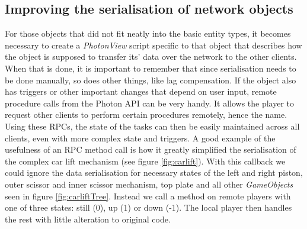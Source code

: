 \subsection{Improving the serialisation of network objects}
For those objects that did not fit neatly into the basic entity types, it becomes necessary to create a \textit{PhotonView} script specific to that object that describes how the object is supposed to transfer its' data over the network to the other clients. When that is done, it is important to remember that since serialisation needs to be done manually, so does other things, like lag compensation. If the object also has triggers or other important changes that depend on user input, remote procedure calls from the Photon API can be very handy. It allows the player to request other clients to perform certain procedures remotely, hence the name. Using these RPCs, the state of the tasks can then be easily maintained across all clients, even with more complex state and triggers. A good example of the usefulness of an RPC method call is how it greatly simplified the serialisation of the complex car lift mechanism (see figure \ref{fig:carlift}). With this callback we could ignore the data serialisation for necessary states of the left and right piston, outer scissor and inner scissor mechanism, top plate and all other \textit{GameObjects} seen in figure \ref{fig:carliftTree}. Instead we call a method on remote players with one of three states: still (0), up (1) or down (-1). The local player then handles the rest with little alteration to original code.

